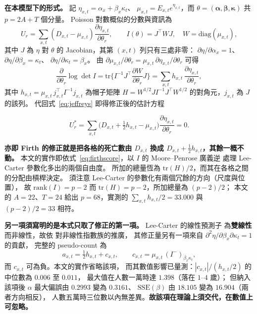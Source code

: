 \documentclass[UTF8, fontset=macnew, a4paper, 12pt]{ctexart}
\begin{document}
\textbf{在本模型下的形式。} 記 $\eta_{x,t}=\alpha_x+\beta_x\kappa_t$、
$\mu_{x,t}=E_{x,t}e^{\eta_{x,t}}$，而 $\theta=(\boldsymbol\alpha,
\boldsymbol\beta,\boldsymbol\kappa)$ 共 $p=2A+T$ 個分量。
Poisson 對數概似的分數與資訊為
$$U_r=\sum_{x,t}(D_{x,t}-\mu_{x,t})\frac{\partial\eta_{x,t}}{\partial\theta_r},
\qquad I(\theta)=J^{\top}WJ,\quad W=\mathrm{diag}(\mu_{x,t}),$$
其中 $J$ 為 $\eta$ 對 $\theta$ 的 Jacobian，其第 $(x,t)$ 列只有三處非零：
$\partial\eta/\partial\alpha_x=1$、$\partial\eta/\partial\beta_x=\kappa_t$、
$\partial\eta/\partial\kappa_t=\beta_x$。
由 $\partial\mu_{x,t}/\partial\theta_r
=\mu_{x,t}\,\partial\eta_{x,t}/\partial\theta_r$ 可得
$$\frac{\partial}{\partial\theta_r}\log\det I
=\mathrm{tr}\Big\{I^{-1}J^{\top}\frac{\partial W}{\partial\theta_r}J\Big\}
=\sum_{x,t}h_{x,t}\,\frac{\partial\eta_{x,t}}{\partial\theta_r},$$
其中 $h_{x,t}=\mu_{x,t}\,j_{x,t}^{\top}I^{-1}j_{x,t}$ 為帽子矩陣
$H=W^{1/2}JI^{-1}J^{\top}W^{1/2}$ 的對角元，$j_{x,t}$ 為 $J$ 的該列。
代回式~\eqref{eq:jeffreys} 即得修正後的估計方程

\begin{equation}\label{eq:firthscore}
U^{*}_r=\sum_{x,t}\Big(D_{x,t}+\tfrac{1}{2}h_{x,t}-\mu_{x,t}\Big)
\frac{\partial\eta_{x,t}}{\partial\theta_r}=0 .
\end{equation}

\textbf{亦即 Firth 的修正就是把各格的死亡數由 $D_{x,t}$ 換成
$D_{x,t}+\tfrac12 h_{x,t}$，其餘一概不動。}
本文的實作即依式~\eqref{eq:firthscore}，以 $I$ 的 Moore--Penrose 廣義逆
處理 Lee-Carter 參數化多出的兩個自由度。
所加的總量恆為 $\mathrm{tr}(H)/2$，而其在各格之間的分配由槓桿決定。
須注意 Lee-Carter 的參數化有兩個冗餘的方向（尺度與位置），
故 $\mathrm{rank}(I)=p-2$ 而 $\mathrm{tr}(H)=p-2$，所加總量為 $(p-2)/2$；
本文的 $A=22$、$T=24$ 給出 $p=68$，實測的 $\sum_{x,t}h_{x,t}/2=33.000$
與 $(p-2)/2=33$ 相符。

\textbf{另一項須寫明的是本式只取了修正的第一項。} Lee-Carter 的線性預測子
為\textbf{雙線性}而非線性，故依 \citet{kosmidis2009} 對非線性指數族的推廣，
其修正量另有一項來自 $\partial^2\eta/\partial\beta_x\partial\kappa_t=1$ 的貢獻，
完整的 pseudo-count 為
$$a_{x,t}=\tfrac12 h_{x,t}+c_{x,t},\qquad
c_{x,t}=\mu_{x,t}\,(I^{-})_{\beta_x\kappa_t},$$
而 $c_{x,t}$ 可為負。本文的實作省略該項，
而其數值影響已量測：$|c_{x,t}|/(h_{x,t}/2)$ 的中位數為 $0.006$ 至 $0.011$，
最大值在人數一萬時達 $1.398$（落在 $1$--$4$ 歲）；
但納入該項後 $\alpha$ 最大偏誤由 $0.2993$ 變為 $0.3161$、
$\mathrm{SSE}(\beta)$ 由 $18.105$ 變為 $16.904$（兩者方向相反），
人數五萬時三位數以內無差異。\textbf{故該項在理論上須交代，在數值上可忽略。}
\end{document}
